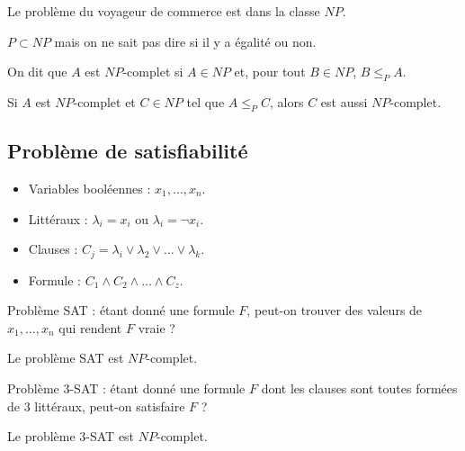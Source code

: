 \documentclass[a4paper,11pt,twocolumn]{article}
\begin{document}
		\begin{pop}
		Le problème du voyageur de commerce est dans la classe $NP$.
		\end{pop}

		\begin{rem}
		$P \subset NP$ mais on ne sait pas dire si il y a égalité ou non.
		\end{rem}

		\begin{defn}
		On dit que $A$ est $NP$-complet si $A \in NP$ et, pour tout $B \in NP$, $B \leq_P A$.
		\end{defn}

		\begin{pop}
		Si $A$ est $NP$-complet et $C \in NP$ tel que $A \leq_P C$, alors $C$ est aussi $NP$-complet.
		\end{pop}

	\subsection{Problème de satisfiabilité}

		\begin{voc}
			\begin{itemize}
			\item Variables booléennes : $x_1,\ldots,x_n$.
			\item Littéraux : $\lambda_i = x_i$ ou $\lambda_i = \neg x_i$.
			\item Clauses : $C_j = \lambda_i \vee \lambda_2 \vee \ldots \vee \lambda_k$.
			\item Formule : $C_1 \wedge C_2 \wedge \ldots \wedge C_z$.
			\end{itemize}
		\end{voc}

		\begin{defn}
		Problème SAT : étant donné une formule $F$, peut-on trouver des valeurs de $x_1,\ldots,x_n$ qui rendent $F$ vraie ?
		\end{defn}

		\begin{thm}
		Le problème SAT est $NP$-complet.
		\end{thm}

		\begin{defn}
		Problème 3-SAT : étant donné une formule $F$ dont les clauses sont toutes formées de 3 littéraux, peut-on satisfaire $F$ ?
		\end{defn}

		\begin{thm}
		Le problème 3-SAT est $NP$-complet.
		\end{thm}
		
\end{document}
